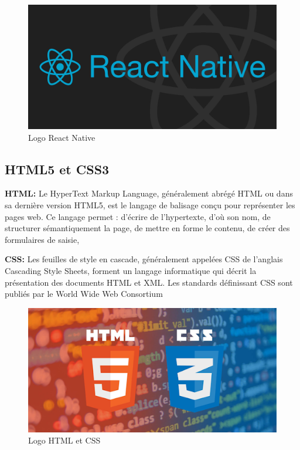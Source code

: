 \begin{figure}[h]
	\centering
    \includegraphics[scale=0.1]{img/part3/4.5}
    \caption{Logo React Native}
\end{figure} 

\subsection{HTML5 et CSS3}
\textbf{HTML: }Le HyperText Markup Language, généralement abrégé HTML ou dans sa dernière version HTML5, est le langage de balisage conçu pour représenter les pages web. Ce langage permet : d’écrire de l’hypertexte, d’où son nom, de structurer sémantiquement la page, de mettre en forme le contenu, de créer des formulaires de saisie,

\textbf{CSS: } Les feuilles de style en cascade, généralement appelées CSS de l'anglais Cascading Style Sheets, forment un langage informatique qui décrit la présentation des documents HTML et XML. Les standards définissant CSS sont publiés par le World Wide Web Consortium

\begin{figure}[h]
	\centering
    \includegraphics[scale=0.3]{img/part3/4.6}
    \caption{Logo HTML et CSS}
\end{figure}